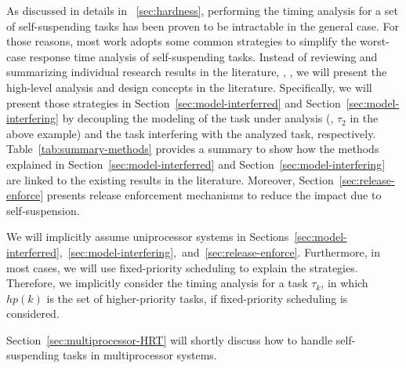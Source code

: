 As discussed in details in \mysectionref{}~\ref{sec:hardness}, performing the timing analysis for a set of self-suspending tasks has been proven to be intractable in the general case. For those reasons, most work adopts some common strategies to simplify the worst-case response time analysis of self-suspending tasks. Instead of reviewing and summarizing individual research results in the literature, \eg, \cite{Raj:suspension1991,RTCSA-KimCPKH95,MingLiRTCSA1994,PH:rtss98,ECRTS-AudsleyB04,RTAS-AudsleyB04,RTCSA-BletsasA05,LR:rtas10,RTSS-KimANR13,LiuChen:rtss2014,huangpass:dac2015,Huang:multiseg,WC16-suspend-DATE}, we will present the high-level analysis and design concepts in the literature. Specifically, we will present those strategies in Section~\ref{sec:model-interferred} and Section~\ref{sec:model-interfering} by decoupling the modeling of the task under analysis (\ie, $\tau_2$ in the above example) and the task interfering with the analyzed task, respectively. Table~\ref{tab:summary-methods} provides a summary to show how the methods explained in Section~\ref{sec:model-interferred} and Section~\ref{sec:model-interfering} are linked to the existing results in the literature. 
Moreover, Section~\ref{sec:release-enforce} presents  release enforcement mechanisms to reduce the impact due to self-suspension. 

We will implicitly assume uniprocessor systems in Sections~\ref{sec:model-interferred},~\ref{sec:model-interfering},~and~\ref{sec:release-enforce}. 
Furthermore, in most cases, we will use fixed-priority scheduling to explain the strategies. Therefore, we implicitly consider the timing analysis for a task $\tau_k$, in which $hp(k)$ is the set of higher-priority tasks, if fixed-priority scheduling is considered. 

Section~\ref{sec:multiprocessor-HRT} will shortly discuss how to handle self-suspending tasks in multiprocessor systems.




